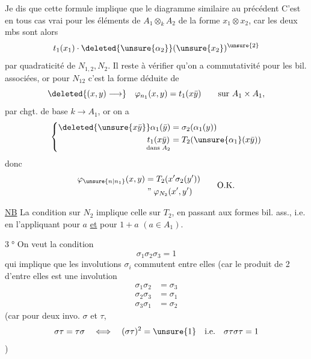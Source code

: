 Je dis que cette formule implique que le diagramme similaire au précédent
C'est en tous cas vrai pour les éléments de  $A_1\otimes_k A_2$ de la forme $x_1\otimes x_2$, car les deux mbs sont alors
\[
 t_1(x_1)\cdot\deleted{\unsure{\alpha_2}}(\unsure{x_2})^{\unsure{2}}
\]
par quadraticité de $N_{1,2},N_2$. Il reste à vérifier qu'on a commutativité pour les  bil. associées, or pour $N_{12}$ c'est la forme déduite de
\[
 \deleted{(x,y)\longrightarrow}\quad\varphi_{n_1}(x,y)=t_1(x\bar y)\qquad\text{sur }A_1\times A_1,
\]
par chgt. de base $k\longrightarrow A_1$, or on a
\[
 \left\{\begin{aligned}
 \deleted{\unsure{x\bar y}}\alpha_1(\bar y)&=\sigma_2(\alpha_1(y))\\
 \underset{\text{dans }A_2}{t_1(x\bar y)}&=T_2(\unsure{\alpha_1}(x\bar y))
 \end{aligned}\right.
\]
donc
\[
 \begin{aligned}
 \varphi_{\unsure{n|n_1}}(x,y)&=T_2(x'\sigma_2(y'))\\
 &\mathrel{\text{''}}\varphi_{N_2}(x',y')
 \end{aligned}\qquad\text{O.K.}
\]

\uline{NB} La condition sur $N_2$ implique celle sur $T_2$, en passant aux formes bil. ass., i.e. en l'appliquant pour $a$ \uline{et} pour $1+a$ $(a\in A_1)$.

\textcircled{3°} On veut la condition
\[
 \boxed{\sigma_1\sigma_2\sigma_3=1}
\]
qui implique que les involutions $\sigma_i$ commutent entre elles (car le produit de 2 d'entre elles est une involution
\[
 \boxed{\begin{aligned}
 \sigma_1\sigma_2&=\sigma_3\\
 \sigma_2\sigma_3&=\sigma_1\\
 \sigma_3\sigma_1&=\sigma_2
 \end{aligned}}
\]
(car pour deux invo. $\sigma$ et $\tau$,
\[
 \sigma\tau=\tau\sigma\quad\Longleftrightarrow\quad(\sigma\tau)^2=\unsure{1}\quad\text{i.e.}\quad\sigma\tau\sigma\tau=1
\]
)

